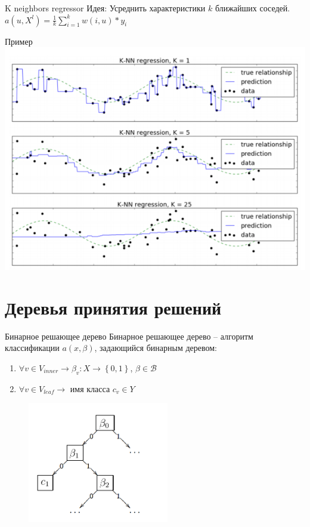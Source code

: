 \documentclass[10pt]{beamer}
\begin{document}
\begin{frame}{K neighbors regressor}
  \alert{Идея}: Усреднить характеристики $k$ ближайших соседей.\\
  \pause
  \bigbreak
  $a(u, X^l) = \frac{1}{k} \sum\limits_{i=1}^k w(i, u)*y_i$
\end{frame}

\begin{frame}{Пример}
  \centering
  \includegraphics[width=0.9 \textwidth, keepaspectratio]{images/knn}
\end{frame}

\section{Деревья принятия решений}

\begin{frame}{Бинарное решающее дерево}
	Бинарное решающее дерево -- алгоритм классификации $a(x, \beta)$, задающийся бинарным деревом:\\
	\begin{enumerate}[--]
  	  \item $\forall v \in V_{inner} \rightarrow \beta_v: X \rightarrow \left\{ 0,1\right\}$, $\beta \in \mathscr{B}$
	  \item $\forall v \in V_{leaf} \rightarrow $ имя класса $c_v \in Y$\\
	\end{enumerate}	

	\begin{figure}[htbp]
	  \includegraphics[height=150pt, keepaspectratio = true]{images/binary_tree}   
	\end{figure}
\end{frame}
\end{document}

